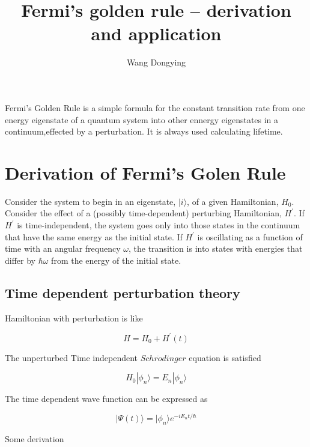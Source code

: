 \documentclass{article}
\author{Wang Dongying}
\title{Fermi's golden rule -- derivation and application}
\begin{document}
\maketitle

Fermi's Golden Rule is a simple formula for the constant transition rate from one energy eigenstate of a quantum system into other ennergy eigenstates in a continuum,effected by a perturbation. It is always used calculating lifetime.

\section{Derivation of Fermi's Golen Rule}
	
	Consider the system to begin in an eigenstate, $| i\rangle$, of a given Hamiltonian, $H_{0}$. Consider the effect of a (possibly time-dependent) perturbing Hamiltonian, $H^{'}$. If $H^{'}$ is time-independent, the system goes only into those states in the continuum that have the same energy as the initial state. If $H^{'}$ is oscillating as a function of time with an angular frequency $\omega$, the transition is into states with energies that differ by $\hbar\omega$ from the energy of the initial state.

	\subsection{Time dependent perturbation theory}

		Hamiltonian with perturbation is like

		\begin{equation}
			H = H_{0} + H^{'}(t)
		\end{equation}

		The unperturbed Time independent $Schr\ddot{o}dinger$ equation is satisfied

		\begin{equation}
			H_{0}|\phi_{n}\rangle = E_{n}|\phi_{n}\rangle
		\end{equation}

		The time dependent wave function can be expressed as 

		\begin{equation}
			|\Psi(t)\rangle = |\phi_{n}\rangle e^{-iE_{n}t/\hbar}
		\end{equation}

		Some derivation
\end{document}
